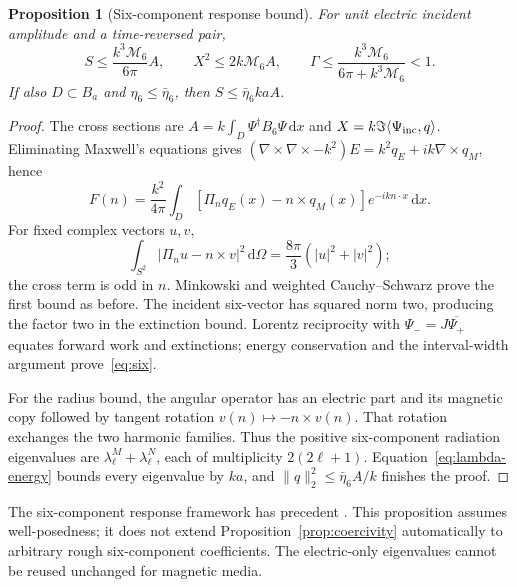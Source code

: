 \documentclass[11pt]{article}
\newtheorem{proposition}[theorem]{Proposition}
\newcommand{\dd}{\,\mathrm{d}}
\newcommand{\ip}[2]{\langle #1,#2\rangle}
\newcommand{\norm}[1]{\lVert #1\rVert}
\newcommand{\abs}[1]{\lvert #1\rvert}
\begin{document}
\begin{proposition}[Six-component response bound]\label{prop:six}
For unit electric incident amplitude and a time-reversed pair,
\begin{equation}\label{eq:six}
 S\leq\frac{k^3\mathcal M_6}{6\pi}A,\qquad
 X^2\leq2k\mathcal M_6A,\qquad
 \Gamma\leq\frac{k^3\mathcal M_6}{6\pi+k^3\mathcal M_6}<1.
\end{equation}
If also $D\subset B_a$ and $\eta_6\leq\bar\eta_6$, then $S\leq\bar\eta_6kaA$.
\end{proposition}
\begin{proof}
The cross sections are $A=k\int_D\Psi^\dagger B_6\Psi\dd x$ and $X=k\Im\ip{\Psi_{\rm inc}}q$. Eliminating Maxwell's equations gives $(\nabla\times\nabla\times-k^2)E=k^2q_E+ik\nabla\times q_M$, hence
\[
 F(n)=\frac{k^2}{4\pi}\int_D[\Pi_nq_E(x)-n\times q_M(x)]e^{-ikn\cdot x}\dd x.
\]
For fixed complex vectors $u,v$,
\[
 \int_{S^2}\abs{\Pi_nu-n\times v}^2\dd\Omega
 =\frac{8\pi}{3}(\abs u^2+\abs v^2);
\]
the cross term is odd in $n$. Minkowski and weighted Cauchy--Schwarz prove the first bound as before. The incident six-vector has squared norm two, producing the factor two in the extinction bound. Lorentz reciprocity with $\Psi_-=J\overline{\Psi_+}$ equates forward work and extinctions; energy conservation and the interval-width argument prove~\eqref{eq:six}.

For the radius bound, the angular operator has an electric part and its magnetic copy followed by tangent rotation $v(n)\mapsto-n\times v(n)$. That rotation exchanges the two harmonic families. Thus the positive six-component radiation eigenvalues are $\lambda^M_\ell+\lambda^N_\ell$, each of multiplicity $2(2\ell+1)$. Equation~\eqref{eq:lambda-energy} bounds every eigenvalue by $ka$, and $\norm q_2^2\leq\bar\eta_6A/k$ finishes the proof.
\end{proof}
The six-component response framework has precedent \citep{Miller2016}. This proposition assumes well-posedness; it does not extend Proposition~\ref{prop:coercivity} automatically to arbitrary rough six-component coefficients. The electric-only eigenvalues cannot be reused unchanged for magnetic media.
\end{document}
